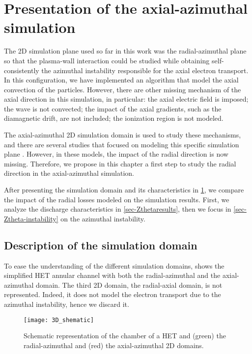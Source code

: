 
\section{Presentation of the axial-azimuthal simulation}
\label{sec-ztheta_description}
The \ac{2D} simulation plane used so far in this work was the radial-azimuthal plane so that the plasma-wall interaction could be studied while obtaining self-consistently the azimuthal instability responsible for the axial electron transport.
In this configuration, we have implemented an algorithm that model the axial convection of the particles.
However, there are other missing mechanism of the axial direction in this simulation, in particular\string: the axial electric field is imposed\string; the wave is not convected\string; the impact of the axial gradients, such as the diamagnetic drift, are not included\string; the ionization region is not modeled.

The axial-azimuthal \ac{2D} simulation domain is used to study these mechanisms, and there are several studies that focused on modeling this specific simulation plane \citep{adam2004,coche2014,boeuf2018,taccogna2019}.
However, in these models, the impact of the radial direction is now missing.
Therefore, we propose in this chapter a first step to study the radial direction in the axial-azimuthal simulation.

After presenting the simulation domain and its characteristics in \cref{sec-ztheta_description}, we compare the impact of the radial losses modeled on the simulation results.
First, we analyze the discharge characteristics in \cref{sec-Zthetaresults}, then we focus in \cref{sec-Ztheta-instability} on the azimuthal instability.


\subsection{Description of the simulation domain} \label{subsec-ztheta_description}
To ease the understanding of the different simulation domains,  shows the simplified \ac{HET} annular channel with both the radial-azimuthal and the axial-azimuthal \ztheta domain.
The third \ac{2D} domain, the radial-axial domain, is not represented.
Indeed, it does not model the electron transport due to the azimuthal instability, hence we discard it.

\begin{figure}[hbt]
  \centering
  \texttt{[image: 3D\_shematic]}
  \caption{Schematic representation of the chamber of a \acs{HET} and (green) the radial-azimuthal and (red) the axial-azimuthal 2D domains.}
  \label{fig-3Dschematic}
\end{figure}

